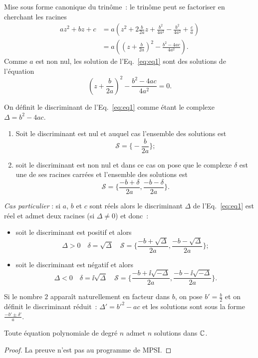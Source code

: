 Mise sous forme canonique du trinôme~: le trinôme peut se factoriser en cherchant les racines
\begin{align}
  az^2+bz+c &= a \left(z^2+ 2 \frac{b}{2a}z + \frac{b^2}{4a^2} - \frac{b^2}{4a^2} +\frac{c}{a} \right)\\
  &=a \left( \left(z+\frac{b}{2a} \right)^2 - \frac{b^2-4ac}{4a^2} \right).
\end{align}
Comme $a$ est non nul, les solution de l'Eq.~\eqref{eq:eq1} sont des solutions de l'équation
\begin{equation}
  \left(z+\frac{b}{2a} \right)^2 - \frac{b^2-4ac}{4a^2} =0.
\end{equation}
%
\begin{defdef}
  On définit le discriminant de l'Eq.~\eqref{eq:eq1} comme étant le complexe $\Delta=b^2-4ac$.
\end{defdef}
%
\begin{enumerate}
\item Soit le discriminant est nul et auquel cas l'ensemble des solutions est
  \begin{equation}
    \mathcal{S}=\biggl\lbrace-\frac{b}{2a} \biggl\rbrace;
  \end{equation}
\item soit le discriminant est non nul et dans ce cas on pose que le complexe $\delta$ est une de ses racines carrées et l'ensemble des solutions est
\begin{equation}
  \mathcal{S}=\biggl\lbrace \frac{-b+\delta}{2a} , \frac{-b-\delta}{2a} \biggl\rbrace.
\end{equation}
\end{enumerate}

\emph{Cas particulier} : si $a$, $b$ et $c$ sont réels alors le discriminant $\Delta$ de l'Eq.~\eqref{eq:eq1} est réel et admet deux racines (si $\Delta \neq 0$) et donc~:
\begin{itemize}
\item soit le discriminant est positif et alors
  \begin{equation}
    \Delta >0 \quad \delta=\sqrt{\Delta} \quad \mathcal{S} = \biggl\lbrace \frac{-b+\sqrt{\Delta}}{2a} , \frac{-b-\sqrt{\Delta}}{2a} \biggl\rbrace;
  \end{equation}
\item soit le discriminant est négatif et alors
  \begin{equation}
    \Delta <0 \quad \delta=\ii\sqrt{\Delta} \quad \mathcal{S} = \biggl\lbrace \frac{-b+\ii\sqrt{-\Delta}}{2a} , \frac{-b-\ii\sqrt{-\Delta}}{2a} \biggl\rbrace.
  \end{equation}
\end{itemize}
Si le nombre $2$ apparaît naturellement en facteur dans $b$, on pose $b'=\frac{b}{2}$ et on définit le discriminant réduit~: $\Delta'=b'^2-ac$ et les solutions sont sous la forme $\frac{-b'\pm \delta'}{a}$.
%
\begin{theo}
  Toute équation polynomiale de degré $n$ admet $n$ solutions dans $\mathbb{C}$.
\end{theo}
\begin{proof}
  La preuve n'est pas au programme de MPSI.
\end{proof}
%
